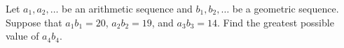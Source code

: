 Let $a_1, a_2, \dots$ be an arithmetic sequence and $b_1, b_2, \dots$ be a geometric sequence. Suppose that $a_1 b_1 = 20$, $a_2 b_2 = 19$, and $a_3 b_3 = 14$. Find the greatest possible value of $a_4 b_4$.